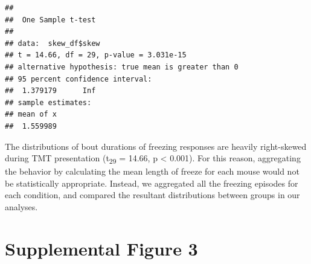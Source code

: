 \documentclass[
]{book}
\newenvironment{Shaded}{\begin{snugshade}}{\end{snugshade}}
\newcommand{\AttributeTok}[1]{\textcolor[rgb]{0.13,0.29,0.53}{#1}}
\newcommand{\DecValTok}[1]{\textcolor[rgb]{0.00,0.00,0.81}{#1}}
\newcommand{\FunctionTok}[1]{\textcolor[rgb]{0.13,0.29,0.53}{\textbf{#1}}}
\newcommand{\NormalTok}[1]{#1}
\newcommand{\OtherTok}[1]{\textcolor[rgb]{0.56,0.35,0.01}{#1}}
\newcommand{\SpecialCharTok}[1]{\textcolor[rgb]{0.81,0.36,0.00}{\textbf{#1}}}
\newcommand{\StringTok}[1]{\textcolor[rgb]{0.31,0.60,0.02}{#1}}
\begin{document}
\begin{Shaded}
\end{Shaded}

\begin{verbatim}
## 
##  One Sample t-test
## 
## data:  skew_df$skew
## t = 14.66, df = 29, p-value = 3.031e-15
## alternative hypothesis: true mean is greater than 0
## 95 percent confidence interval:
##  1.379179      Inf
## sample estimates:
## mean of x 
##  1.559989
\end{verbatim}

The distributions of bout durations of freezing responses are heavily right-skewed during TMT presentation (t\textsubscript{29} = 14.66, p \textless{} 0.001). For this reason, aggregating the behavior by calculating the mean length of freeze for each mouse would not be statistically appropriate. Instead, we aggregated all the freezing episodes for each condition, and compared the resultant distributions between groups in our analyses.

\chapter*{Supplemental Figure 3}\label{supplemental-figure-3}
\end{document}
